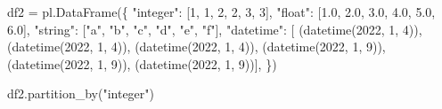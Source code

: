 \documentclass[
  letterpaper,
  DIV=11,
  numbers=noendperiod]{scrartcl}
\newenvironment{Shaded}{\begin{snugshade}}{\end{snugshade}}
\newcommand{\DecValTok}[1]{\textcolor[rgb]{0.68,0.00,0.00}{#1}}
\newcommand{\FloatTok}[1]{\textcolor[rgb]{0.68,0.00,0.00}{#1}}
\newcommand{\NormalTok}[1]{\textcolor[rgb]{0.00,0.23,0.31}{#1}}
\newcommand{\OperatorTok}[1]{\textcolor[rgb]{0.37,0.37,0.37}{#1}}
\newcommand{\StringTok}[1]{\textcolor[rgb]{0.13,0.47,0.30}{#1}}
\begin{document}
\begin{Shaded}
\begin{Highlighting}[]
\NormalTok{df2 }\OperatorTok{=}\NormalTok{ pl.DataFrame(\{}
    \StringTok{"integer"}\NormalTok{: [}\DecValTok{1}\NormalTok{, }\DecValTok{1}\NormalTok{, }\DecValTok{2}\NormalTok{, }\DecValTok{2}\NormalTok{, }\DecValTok{3}\NormalTok{, }\DecValTok{3}\NormalTok{],}
    \StringTok{"float"}\NormalTok{: [}\FloatTok{1.0}\NormalTok{, }\FloatTok{2.0}\NormalTok{, }\FloatTok{3.0}\NormalTok{, }\FloatTok{4.0}\NormalTok{, }\FloatTok{5.0}\NormalTok{, }\FloatTok{6.0}\NormalTok{],}
    \StringTok{"string"}\NormalTok{: [}\StringTok{"a"}\NormalTok{, }\StringTok{"b"}\NormalTok{, }\StringTok{"c"}\NormalTok{, }\StringTok{"d"}\NormalTok{, }\StringTok{"e"}\NormalTok{, }\StringTok{"f"}\NormalTok{],}
    \StringTok{"datetime"}\NormalTok{: [}
\NormalTok{        (datetime(}\DecValTok{2022}\NormalTok{, }\DecValTok{1}\NormalTok{, }\DecValTok{4}\NormalTok{)), }
\NormalTok{        (datetime(}\DecValTok{2022}\NormalTok{, }\DecValTok{1}\NormalTok{, }\DecValTok{4}\NormalTok{)), }
\NormalTok{        (datetime(}\DecValTok{2022}\NormalTok{, }\DecValTok{1}\NormalTok{, }\DecValTok{4}\NormalTok{)), }
\NormalTok{        (datetime(}\DecValTok{2022}\NormalTok{, }\DecValTok{1}\NormalTok{, }\DecValTok{9}\NormalTok{)), }
\NormalTok{        (datetime(}\DecValTok{2022}\NormalTok{, }\DecValTok{1}\NormalTok{, }\DecValTok{9}\NormalTok{)), }
\NormalTok{        (datetime(}\DecValTok{2022}\NormalTok{, }\DecValTok{1}\NormalTok{, }\DecValTok{9}\NormalTok{))],}
\NormalTok{\})}
\end{Highlighting}
\end{Shaded}

\begin{Shaded}
\begin{Highlighting}[]
\NormalTok{df2.partition\_by(}\StringTok{"integer"}\NormalTok{)}
\end{Highlighting}
\end{Shaded}
\end{document}
